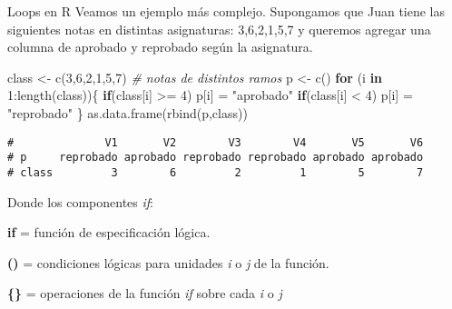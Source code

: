 \documentclass[
  8pt,
  ignorenonframetext,
]{beamer}
\newenvironment{Shaded}{\begin{snugshade}}{\end{snugshade}}
\newcommand{\CommentTok}[1]{\textcolor[rgb]{0.56,0.35,0.01}{\textit{#1}}}
\newcommand{\ControlFlowTok}[1]{\textcolor[rgb]{0.13,0.29,0.53}{\textbf{#1}}}
\newcommand{\DecValTok}[1]{\textcolor[rgb]{0.00,0.00,0.81}{#1}}
\newcommand{\FunctionTok}[1]{\textcolor[rgb]{0.00,0.00,0.00}{#1}}
\newcommand{\NormalTok}[1]{#1}
\newcommand{\OtherTok}[1]{\textcolor[rgb]{0.56,0.35,0.01}{#1}}
\newcommand{\SpecialCharTok}[1]{\textcolor[rgb]{0.00,0.00,0.00}{#1}}
\newcommand{\StringTok}[1]{\textcolor[rgb]{0.31,0.60,0.02}{#1}}
\begin{document}
\begin{frame}[fragile]{Loops en R}
\protect\hypertarget{loops-en-r-6}{}
Veamos un ejemplo más complejo. Supongamos que Juan tiene las siguientes
notas en distintas asignaturas: 3,6,2,1,5,7 y queremos agregar una
columna de aprobado y reprobado según la asignatura.

\begin{Shaded}
\begin{Highlighting}[]
\NormalTok{class }\OtherTok{\textless{}{-}} \FunctionTok{c}\NormalTok{(}\DecValTok{3}\NormalTok{,}\DecValTok{6}\NormalTok{,}\DecValTok{2}\NormalTok{,}\DecValTok{1}\NormalTok{,}\DecValTok{5}\NormalTok{,}\DecValTok{7}\NormalTok{)  }\CommentTok{\# notas de distintos ramos}
\NormalTok{p }\OtherTok{\textless{}{-}} \FunctionTok{c}\NormalTok{()}
\ControlFlowTok{for}\NormalTok{ (i }\ControlFlowTok{in} \DecValTok{1}\SpecialCharTok{:}\FunctionTok{length}\NormalTok{(class))\{}
\ControlFlowTok{if}\NormalTok{(class[i] }\SpecialCharTok{\textgreater{}=} \DecValTok{4}\NormalTok{) p[i] }\OtherTok{=} \StringTok{"aprobado"}
\ControlFlowTok{if}\NormalTok{(class[i] }\SpecialCharTok{\textless{}} \DecValTok{4}\NormalTok{) p[i] }\OtherTok{=} \StringTok{"reprobado"}
\NormalTok{\}}
\FunctionTok{as.data.frame}\NormalTok{(}\FunctionTok{rbind}\NormalTok{(p,class))}
\end{Highlighting}
\end{Shaded}

\begin{verbatim}
#              V1       V2        V3        V4       V5       V6
# p     reprobado aprobado reprobado reprobado aprobado aprobado
# class         3        6         2         1        5        7
\end{verbatim}

Donde los componentes \emph{if}:

\textbf{if} = función de especificación lógica.

\textbf{()} = condiciones lógicas para unidades \emph{i} o \emph{j} de
la función.

\textbf{\{\}} = operaciones de la función \emph{if} sobre cada \emph{i}
o \emph{j}
\end{frame}
\end{document}
